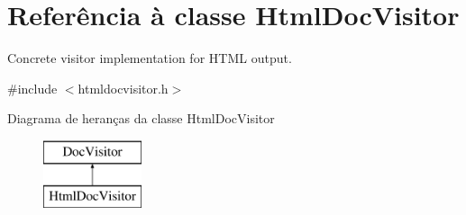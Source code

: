 \hypertarget{class_html_doc_visitor}{\section{Referência à classe Html\-Doc\-Visitor}
\label{class_html_doc_visitor}
}


Concrete visitor implementation for H\-T\-M\-L output.  




{\ttfamily \#include $<$htmldocvisitor.\-h$>$}

Diagrama de heranças da classe Html\-Doc\-Visitor\begin{figure}[H]
\begin{center}
\leavevmode
\includegraphics[height=2.000000cm]{class_html_doc_visitor}
\end{center}
\end{figure}
